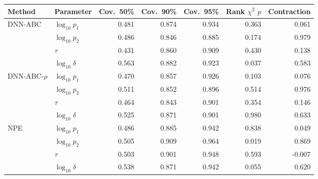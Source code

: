 \begin{tabular}{llrrrrr}
\toprule
Method & Parameter & Cov.\ 50\% & Cov.\ 90\% & Cov.\ 95\% & Rank $\chi^2$ $p$ & Contraction \\
\midrule
DNN-ABC & $\log_{10}p_1$ & 0.481 & 0.874 & 0.934 & 0.363 & 0.061 \\
 & $\log_{10}p_2$ & 0.486 & 0.846 & 0.885 & 0.174 & 0.979 \\
 & $\tau$ & 0.431 & 0.860 & 0.909 & 0.430 & 0.138 \\
 & $\log_{10}\delta$ & 0.563 & 0.882 & 0.923 & 0.037 & 0.583 \\
\midrule
DNN-ABC-$\rho$ & $\log_{10}p_1$ & 0.470 & 0.857 & 0.926 & 0.103 & 0.076 \\
 & $\log_{10}p_2$ & 0.511 & 0.852 & 0.896 & 0.514 & 0.976 \\
 & $\tau$ & 0.464 & 0.843 & 0.901 & 0.354 & 0.146 \\
 & $\log_{10}\delta$ & 0.525 & 0.871 & 0.901 & 0.980 & 0.633 \\
\midrule
NPE & $\log_{10}p_1$ & 0.486 & 0.885 & 0.942 & 0.838 & 0.049 \\
 & $\log_{10}p_2$ & 0.505 & 0.909 & 0.964 & 0.019 & 0.869 \\
 & $\tau$ & 0.503 & 0.901 & 0.948 & 0.593 & -0.007 \\
 & $\log_{10}\delta$ & 0.538 & 0.871 & 0.942 & 0.055 & 0.620 \\
\bottomrule
\end{tabular}
